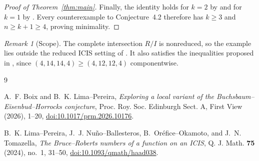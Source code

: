 \documentclass[11pt]{amsart}
\theoremstyle{remark}
\newtheorem{remark}[theorem]{Remark}
\begin{document}
\begin{proof}[Proof of Theorem~\ref{thm:main}]
Finally, the identity holds for $k=2$ by \cite[Theorem~0.2(ii)]{BLP} and for
$k=1$ by \cite[Remark~4.3(ii)]{BLP}. Every counterexample to Conjecture~4.2
therefore has $k\geq3$ and $n\geq k+1\geq4$, proving minimality.
\end{proof}

\begin{remark}[Scope]
The complete intersection $R/I$ is nonreduced, so the example lies outside the
reduced ICIS setting of \cite[Conjecture~4.1]{BLP}. It also satisfies the
inequalities proposed in \cite[Question~5.1]{BLP}, since
$(4,14,14,4)\geq(4,12,12,4)$ componentwise.
\end{remark}

\enlargethispage{2\baselineskip}

\begin{thebibliography}{9}

A.~F. Boix and B.~K. Lima--Pereira,
\emph{Exploring a local variant of the Buchsbaum--Eisenbud--Horrocks
conjecture},
Proc. Roy. Soc. Edinburgh Sect. A, First View (2026), 1--20,
\href{https://doi.org/10.1017/prm.2026.10176}
{doi:10.1017/prm.2026.10176}.

B.~K. Lima--Pereira, J.~J. Nu\~no--Ballesteros,
B.~Or\'efice--Okamoto, and J.~N. Tomazella,
\emph{The Bruce--Roberts numbers of a function on an ICIS},
Q. J. Math. \textbf{75} (2024), no.~1, 31--50,
\href{https://doi.org/10.1093/qmath/haad038}
{doi:10.1093/qmath/haad038}.

\end{thebibliography}
\end{document}

